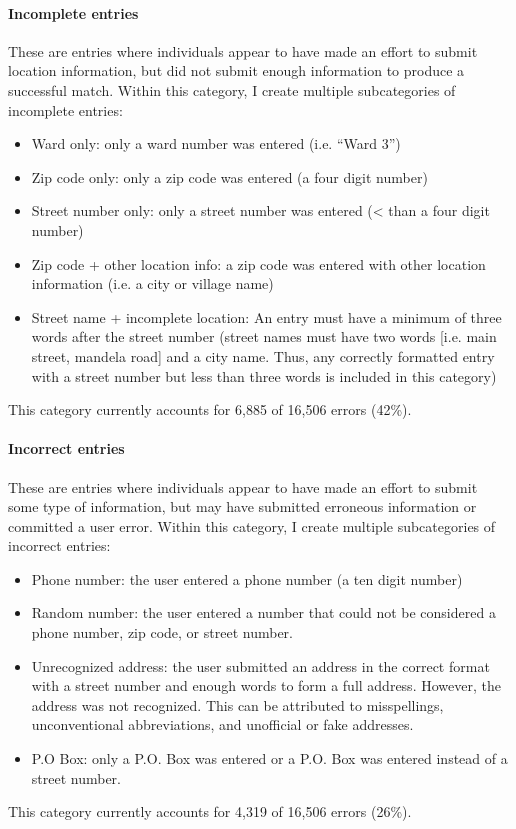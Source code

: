 \documentclass[12pt]{article}
\begin{document}
\paragraph{Incomplete entries} These are entries where individuals appear to have made an effort to submit location information, but did not submit enough information to produce a successful match. Within this category, I create multiple subcategories of incomplete entries: 
\begin{itemize}
\item Ward only: only a ward number was entered (i.e. ``Ward 3'')
\item Zip code only: only a zip code was entered (a four digit number)
\item Street number only: only a street number was entered (< than a four digit number)
\item Zip code + other location info: a zip code was entered with other location information (i.e. a city or village name)
\item Street name + incomplete location: An entry must have a minimum of three words after the street number (street names must have two words [i.e. main street, mandela road] and a city name. Thus, any correctly formatted entry with a street number but less than three words is included in this category) 
\end{itemize}
This category currently accounts for 6,885 of 16,506 errors (42\%). 

\paragraph{Incorrect entries} These are entries where individuals appear to have made an effort to submit some type of information, but may have submitted erroneous information or committed a user error. Within this category, I create multiple subcategories of incorrect entries: 
\begin{itemize}
\item Phone number: the user entered a phone number (a ten digit number)
\item Random number: the user entered a number that could not be considered a phone number, zip code, or street number.
\item Unrecognized address: the user submitted an address in the correct format with a street number and enough words to form a full address. However, the address was not recognized. This can be attributed to misspellings, unconventional abbreviations, and unofficial or fake addresses.
\item P.O Box: only a P.O. Box was entered or a P.O. Box was entered instead of a street number. 
\end{itemize}
This category currently accounts for  4,319 of 16,506 errors (26\%). 
\end{document}
